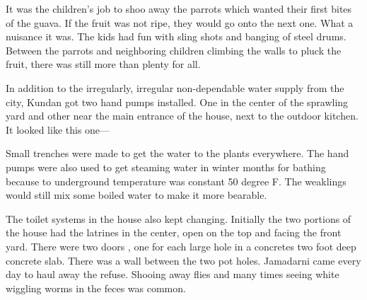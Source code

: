  It was the children's job to shoo away the parrots which wanted their first bites of the guava. If the fruit was not ripe, they would go onto the next one. What a nuisance it was. The kids had fun with sling shots and banging of steel drums. Between the parrots and neighboring children climbing the walls to pluck the fruit, there was still more than plenty for all.  

In addition to the irregularly, irregular non-dependable water supply from the city, Kundan got two hand pumps installed. One in the center of the sprawling yard and other near the main entrance of the house, next to the outdoor kitchen. It looked like this one—
 
Small trenches were made to get the water to the plants everywhere. The hand pumps were also used to get steaming water in winter months for bathing because to underground temperature was constant 50 degree F. The weaklings would still mix some boiled water to make it more bearable. 

The toilet systems in the house also kept changing. Initially the two portions of the house had the latrines in the center, open on the top and facing the front yard. There were two doors , one for each large hole in a concretes two foot deep concrete slab. There was a wall between the two pot holes. Jamadarni came every day to haul away the refuse. Shooing away flies and many times seeing white wiggling worms in the feces was common. 

